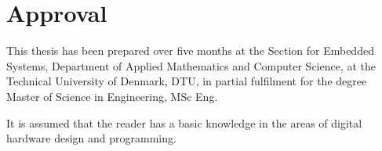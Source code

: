 \section*{Approval}
This thesis has been prepared over five months at the Section for Embedded Systems, Department of Applied Mathematics and Computer Science, at the Technical University of Denmark, DTU, in partial fulfilment for the degree Master of Science in Engineering, MSc Eng. 

It is assumed that the reader has a basic knowledge in the areas of digital hardware design and programming. 

\vfill

\begin{center}
\namesigdate{\thesisauthor~-~\studentnumber}
\end{center}

\vfill

